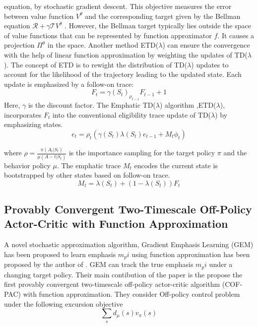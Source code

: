 equation, by stochastic gradient descent. This objective measures the error between value function $V^\theta$ and the corresponding target given by the Bellman equation $\mathcal{R}+\gamma \mathcal{T}V^\theta$
. However, the Bellman target typically lies outside the space of value functions that can be represented by function approximator $f$. It causes a projection $\Pi^\theta$ in the space.
Another method ETD($\lambda$)\cite{sutton2016emphatic} can ensure the convergence with the help of linear function approximation by weighting the updates of TD($\lambda$). The concept of ETD is to rewight the distribution of TD($\lambda$) updates to account for the likelihood of the trajectory leading to the updated state. Each update is emphasized by a follow-on trace:
\begin{equation}
    F_t=\gamma(S_t)_{\rho_{t-1}} F_{t-1} +1
\end{equation}
Here, $\gamma$ is the discount factor. The Emphatic TD($\lambda$) algorithm \cite{sutton2016emphatic},ETD($\lambda$), incorporates $F_t$ into the conventional eligibility trace update of TD($\lambda$) by emphasizing states. 
\begin{equation}
    e_t=\rho_t(\gamma(S_t)\lambda (S_t) e_{t-1}+M_t \phi_t )
\end{equation}

where $\rho=\frac{\pi(A_t|S_t)}{\mu(A-t|S_t)}$ is the importance sampling for the target policy $\pi$ and the behavior policy $\mu$. The emphatic trace $M_t$ encodes the current state is bootstrapped by other states based on follow-on trace.
\begin{equation}
    M_t=\lambda(S_t) + (1-\lambda(S_t))F_t
\end{equation}




\subsection{Provably Convergent Two-Timescale Off-Policy Actor-Critic
with Function Approximation \cite{zhang2020provably}}
A novel stochastic approximation algorithm, Gradient Emphasis Learning (GEM) has been proposed to learn emphasis $m_pi$ using function approximation has been proposed by the author of \cite{zhang2020provably}. GEM can track the true emphasis $m_pi$ under a changing target policy. Their main contibution of the paper is the propose the first provably convergent two-timescale off-policy actor-critic algorithm (COF-PAC) with function approximation. They consider Off-policy control problem under the following excursion objective 
  \begin{equation}
     \sum_sd_\mu(s)v_\pi(s)
 \end{equation}
 
